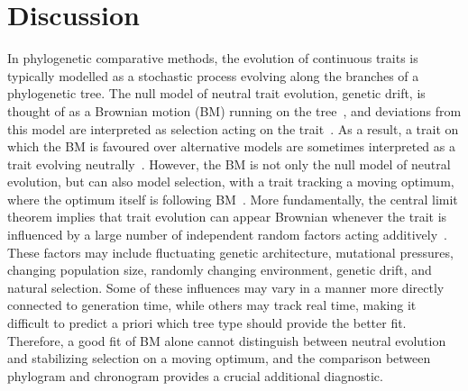 \documentclass{article}
\begin{document}
\section*{Discussion}
In phylogenetic comparative methods, the evolution of continuous traits is typically modelled as a stochastic process evolving along the branches of a phylogenetic tree.
The null model of neutral trait evolution, genetic drift, is thought of as a Brownian motion (BM) running on the tree~\citep{lynch_phenotypic_1986, felsenstein_phylogenies_1988a}, and deviations from this model are interpreted as selection acting on the trait~\citep{butler_phylogenetic_2004}.
As a result, a trait on which the BM is favoured over alternative models are sometimes interpreted as a trait evolving neutrally~\citep{khaitovich_evolution_2006, catalan_drift_2019}.
However, the BM is not only the null model of neutral evolution, but can also model selection, with a trait tracking a moving optimum, where the optimum itself is following BM~\citep{hansen_translating_1996, latrille_detecting_2024}.
More fundamentally, the central limit theorem implies that trait evolution can appear Brownian whenever the trait is influenced by a large number of independent random factors acting additively~\citep{felsenstein_phylogenies_1985}.
These factors may include fluctuating genetic architecture, mutational pressures, changing population size, randomly changing environment, genetic drift, and natural selection.
Some of these influences may vary in a manner more directly connected to generation time, while others may track real time, making it difficult to predict a priori which tree type should provide the better fit.
Therefore, a good fit of BM alone cannot distinguish between neutral evolution and stabilizing selection on a moving optimum, and the comparison between phylogram and chronogram provides a crucial additional diagnostic.
\end{document}
